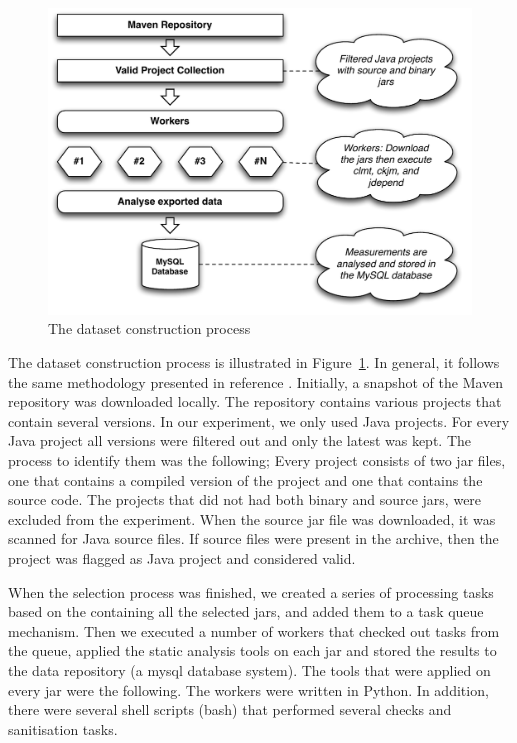 \documentclass{sig-alternate}
\begin{document}
\begin{figure}
\centering
\includegraphics[scale=0.45]{import-process}
\caption{The dataset construction process}
\label{fig:dataset-construction}
\end{figure}

The dataset construction process is illustrated in Figure~\ref{fig:dataset-construction}. In general, it follows the same methodology presented in reference \cite{MKLGS14}. Initially, a snapshot of the Maven repository was downloaded locally. The repository contains various projects that contain several versions. In our experiment, we only used Java projects. For every Java project
all versions were filtered out and only the latest was kept. The process to identify them was the following; Every project consists of two {\sc jar} files, one that contains a compiled version of the project and one that contains the source code. The projects that did not had both binary and source jars, were excluded from the experiment. When the source {\sc jar} file was downloaded, it was scanned for Java source files. If source files were present in the archive, then the project was flagged as Java project and considered valid.

When the selection process was finished, we created a series of processing tasks based on the containing all the selected {\sc jar}s, and added them to a task queue mechanism. Then we executed a number of workers that checked out tasks from the queue, applied the static analysis tools on each {\sc jar} and stored the results to the data repository (a {\sc m}y{\sc sql} database system). The tools that were applied on every {\sc jar} were the following. The workers were written in Python. In addition, there were several shell scripts (bash) that performed several checks and sanitisation tasks.
\end{document}
